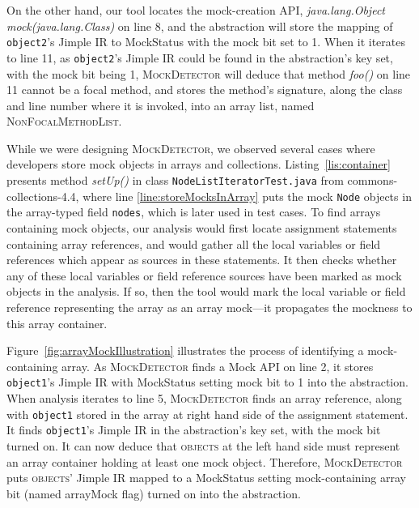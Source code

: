 On the other hand, our tool locates the mock-creation API, \textit{java.lang.Object mock(java.lang.Class)} on line 8, and the abstraction will store the mapping of \texttt{object2}'s Jimple IR to MockStatus with the mock bit set to 1. When it iterates to line 11, as \texttt{object2}'s Jimple IR could be found in the abstraction's key set,  with the mock bit being 1, \textsc{MockDetector} will deduce that method \textit{foo()} on line 11 cannot be a focal method, and stores the method's signature, along the class and line number where it is invoked, into an array list, named \textsc{NonFocalMethodList}. 


While we were designing \textsc{MockDetector}, we observed several cases where developers store mock objects in arrays and collections. Listing~\ref{lis:container} presents method \textit{setUp()} in class \texttt{NodeListIteratorTest.java} from commons-collections-4.4, where line \ref{line:storeMocksInArray} puts the mock \texttt{Node} objects in the array-typed field \texttt{nodes}, which is later used in test cases. To find arrays containing mock objects, our analysis would first locate assignment statements containing array references, and would gather all the local variables or field references which appear as sources in these statements. It then checks whether any of these local variables or field reference sources have been marked as mock objects in the analysis. If so, then the tool would mark the local variable or field reference representing the array as an array mock---it propagates the mockness to this array container.


Figure~\ref{fig:arrayMockIllustration} illustrates the process of identifying a mock-containing array. As \textsc{MockDetector} finds a Mock API on line 2, it stores \texttt{object1}'s Jimple IR with MockStatus setting mock bit to 1 into the abstraction. When analysis iterates to line 5, \textsc{MockDetector} finds an array reference, along with \texttt{object1} stored in the array at right hand side of the assignment statement. It finds \texttt{object1}'s Jimple IR in the abstraction's key set, with the mock bit turned on. It can now deduce that \textsc{objects} at the left hand side must represent an array container holding at least one mock object. Therefore, \textsc{MockDetector} puts \textsc{objects}' Jimple IR mapped to a MockStatus setting mock-containing array bit (named arrayMock flag) turned on into the abstraction. 


